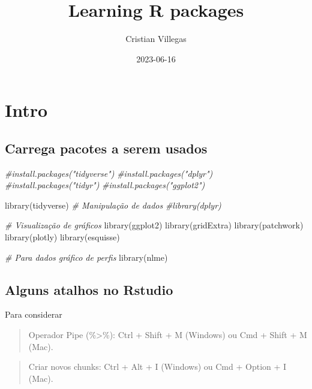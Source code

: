 \documentclass[
]{book}
\title{Learning R packages}
\author{Cristian Villegas}
\date{2023-06-16}
\newenvironment{Shaded}{\begin{snugshade}}{\end{snugshade}}
\newcommand{\CommentTok}[1]{\textcolor[rgb]{0.56,0.35,0.01}{\textit{#1}}}
\newcommand{\FunctionTok}[1]{\textcolor[rgb]{0.00,0.00,0.00}{#1}}
\newcommand{\NormalTok}[1]{#1}
\begin{document}
\maketitle

{
\setcounter{tocdepth}{1}
\tableofcontents
}
\hypertarget{intro}{%
\chapter{Intro}\label{intro}}

\hypertarget{carrega-pacotes-a-serem-usados}{%
\section{Carrega pacotes a serem usados}\label{carrega-pacotes-a-serem-usados}}

\begin{Shaded}
\begin{Highlighting}[]
\CommentTok{\#install.packages("tidyverse") }
\CommentTok{\#install.packages("dplyr")     }
\CommentTok{\#install.packages("tidyr")     }
\CommentTok{\#install.packages("ggplot2")   }

\FunctionTok{library}\NormalTok{(tidyverse)}
\CommentTok{\# Manipulação de dados}
\CommentTok{\#library(dplyr)}

\CommentTok{\# Visualização de gráficos}
\FunctionTok{library}\NormalTok{(ggplot2)}
\FunctionTok{library}\NormalTok{(gridExtra)}
\FunctionTok{library}\NormalTok{(patchwork)}
\FunctionTok{library}\NormalTok{(plotly)}
\FunctionTok{library}\NormalTok{(esquisse)}

\CommentTok{\# Para dados gráfico de perfis}
\FunctionTok{library}\NormalTok{(nlme)}
\end{Highlighting}
\end{Shaded}

\hypertarget{alguns-atalhos-no-rstudio}{%
\section{Alguns atalhos no Rstudio}\label{alguns-atalhos-no-rstudio}}

Para considerar

\begin{quote}
Operador Pipe (\%\textgreater\%): Ctrl + Shift + M (Windows) ou Cmd + Shift + M (Mac).
\end{quote}

\begin{quote}
Criar novos chunks: Ctrl + Alt + I (Windows) ou Cmd + Option + I (Mac).
\end{quote}
\end{document}
